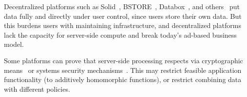 %
Decentralized platforms such as Solid~\cite{solid}, BSTORE~\cite{bstore},
Databox~\cite{databox}, and others~\cite{diy, amber, oort, w5, blockstack} put
data fully and directly under user control, since users store their own data.
%
But this burdens users with maintaining infrastructure, and decentralized platforms
lack the capacity for server-side compute and break today's ad-based
business model.
%
%

%
Some platforms can prove that server-side processing respects
 via cryptographic means~\cite{zeph} or
systems security mechanisms~\cite{riverbed}.
%
This may restrict feasible application functionality (\eg to additively
homomorphic functions), or restrict combining data with different policies.
%
%
